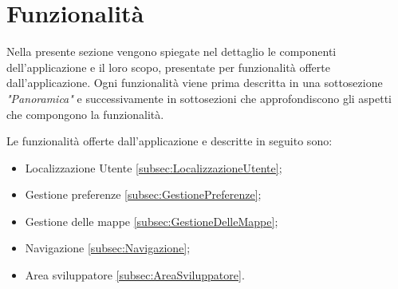 \documentclass[../ManualeSviluppatore.tex]{subfiles}
\begin{document}
\section{Funzionalità}
	Nella presente sezione vengono spiegate nel dettaglio le componenti dell'applicazione e il loro scopo, presentate per funzionalità offerte dall'applicazione.
	Ogni funzionalità viene prima descritta in una sottosezione \textit{"Panoramica"} e successivamente in sottosezioni che approfondiscono gli aspetti che compongono la funzionalità.
	
	Le funzionalità offerte dall'applicazione e descritte in seguito sono:
	\begin{itemize}
		\item Localizzazione Utente \ref{subsec:LocalizzazioneUtente};
		\item Gestione preferenze \ref{subsec:GestionePreferenze};
		\item Gestione delle mappe \ref{subsec:GestioneDelleMappe};
		\item Navigazione \ref{subsec:Navigazione};
		\item Area sviluppatore \ref{subsec:AreaSviluppatore}.
	\end{itemize}
	
	\newpage
	
	
	\newpage
	
	
	\newpage
	
	
	\newpage
	
	
	\newpage
	
\end{document}
